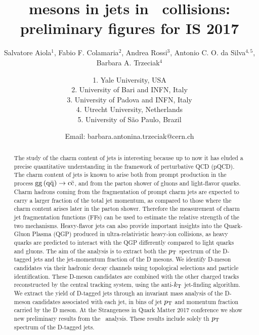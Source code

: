 \documentclass[ALICE,manyauthors]{ALICE_analysis_notes}
\begin{document}
%
%
%
\begin{titlepage}
%
\PHdate{\today}
%
\title{\Dstar mesons in jets in \pPb\ collisions: preliminary figures for IS 2017}
%
\author{Salvatore Aiola$^{1}$, Fabio F. Colamaria$^{2}$, Andrea Rossi$^{3}$, Antonio C. O. da Silva$^{4,5}$, Barbara A. Trzeciak$^{4}$}
\author{
1. Yale University, USA\\
2. University of Bari and INFN, Italy\\
3. University of Padova and INFN, Italy\\
4. Utrecht University, Netherlands\\
5. University of S\~ao Paulo, Brazil\\
}
\author{Email: barbara.antonina.trzeciak@cern.ch}
%
%
\begin{abstract}
The study of the charm content of jets is interesting because up to now
it has eluded a precise quantitative understanding in the framework of perturbative QCD (pQCD).
The charm content of jets is known to arise both from prompt production in the process ${\rm gg\, (q\bar{q})} \rightarrow {\rm c\bar{c}}$, and
from the parton shower of gluons and light-flavor quarks.
Charm hadrons coming from the fragmentation of prompt charm jets 
are expected to carry a larger fraction of the total jet momentum,
as compared to those where the charm content arises later in the
parton shower. Therefore the measurement of charm jet fragmentation functions (FFs) 
can be used to estimate the relative strength of the two mechanisms.
Heavy-flavor jets can also provide important insights into the Quark-Gluon Plasma (QGP)
produced in ultra-relativistic heavy-ion collisions, as heavy quarks are predicted
to interact with the QGP differently compared to light quarks and gluons. 
The aim of the analysis is to extract both the $p_{\rm T}$ spectrum of the D-tagged jets and the jet-momentum fraction of the D mesons. 
We identify D-meson candidates via their hadronic decay channels using topological selections and particle identification.
These D-meson candidates are combined with the other charged tracks reconstructed by the central tracking system, 
using the anti-$k_{\rm T}$ jet-finding algorithm.
We extract the yield of D-tagged jets through an invariant mass analysis of the D-meson candidates associated with each jet, 
in bins of jet $p_{\rm T}$ and momentum fraction carried by the D meson.
At the Strangeness in Quark Matter 2017 conference we show new preliminary results from the \pPb\ analysis. These results
include solely th $p_{\rm T}$ spectrum of the D-tagged jets.
\end{abstract}
\end{titlepage}
%
\tableofcontents
\newpage
\end{document}
